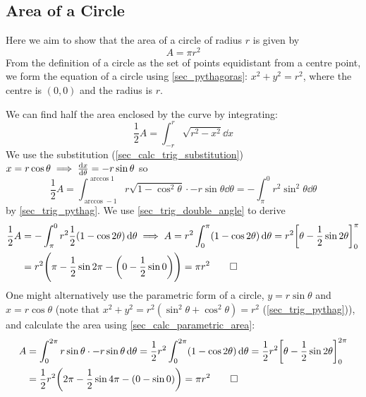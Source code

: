\documentclass[fleqn,a4paper,11pt]{article}
\begin{document}
    \subsection{Area of a Circle}


    Here we aim to show that the area of a circle of radius \(r\) is given by
    \begin{equation}
    A = \pi r^2
    \end{equation}
    From the definition of a circle as the set of points equidistant from a
    centre point, we form the equation of a circle using \ref{sec_pythagoras}:
    \(x^2 + y^2 = r^2\), where the centre is \((0, 0)\) and the radius is \(r\).

    We can find half the area enclosed by the curve by integrating:
    \begin{equation*}
    \frac 12 A = \int_{-r}^r \sqrt{r^2 - x^2} \dd{x}
    \end{equation*}
    We use the substitution (\ref{sec_calc_trig_substitution})
    \(x = r \cos \theta \implies \dv{x}{\theta} = -r \sin \theta\) so
    \begin{equation*}
    \frac 12 A = \int_{\arccos -1}^{\arccos 1}
        r\sqrt{1 - \cos^2 \theta} \cdot -r \sin \theta \dd{\theta}
      = -\int_\pi^0 r^2 \sin^2 \theta \dd{\theta}
    \end{equation*}
    by \ref{sec_trig_pythag}. We use \ref{sec_trig_double_angle} to derive
    \begin{align*}
    \frac 12 A &= -\int_\pi^0
        r^2 \frac 12 (1 - \cos 2 \theta) \dd{\theta} \implies
     A = r^2 \int_0^\pi (1 - \cos 2 \theta) \dd{\theta} =
     r^2\bqty{\theta - \frac 12 \sin 2 \theta}_0^\pi \\
     &= r^2 \pqty{\pi - \frac 12 \sin 2 \pi -
                   \pqty{0 - \frac 12 \sin 0}} = \pi r^2 \qed
    \end{align*}
    One might alternatively use the parametric form of a circle,
    \(y = r \sin \theta\) and \(x = r \cos \theta\)
    (note that \(x^2 + y^2 = r^2(\sin^2 \theta + \cos^2 \theta) = r^2\)
    (\ref{sec_trig_pythag})), and calculate the area using
    \ref{sec_calc_parametric_area}:
    \begin{align*}
    A &= \int_0^{2\pi}
        r \sin \theta \cdot -r \sin \theta \dd{\theta} =
     \frac 12 r^2 \int_0^{2\pi} (1 - \cos 2 \theta) \dd{\theta} =
     \frac 12 r^2 \bqty{\theta - \frac 12 \sin 2 \theta}_0^{2\pi} \\
     &= \frac 12 r^2 \pqty{2\pi - \frac 12 \sin 4 \pi -
                      \pqty{0 - \sin 0}} = \pi r^2 \qed
    \end{align*}
\end{document}
